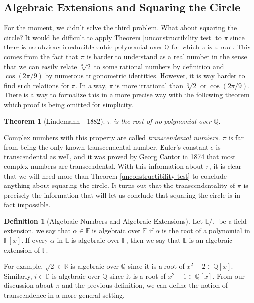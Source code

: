\documentclass{article}
\theoremstyle{plain}
\newtheorem{theorem}{Theorem}[subsection]
\theoremstyle{definition}
\newtheorem*{definition}{Definition}
\newcommand{\C}{\mathbb{C}}
\newcommand{\R}{\mathbb{R}}
\newcommand{\Q}{\mathbb{Q}}
\newcommand{\F}{\mathbb{F}}
\newcommand{\E}{\mathbb{E}}
\begin{document}
\subsection{Algebraic Extensions and Squaring the Circle}

For the moment, we didn't solve the third problem. What about squaring the circle? It would be difficult to apply Theorem \ref{unconstructibility test} to $\pi$ since there is no obvious irreducible cubic polynomial over $\Q$ for which $\pi$ is a root. This comes from the fact that $\pi$ is harder to understand as a real number in the sense that we can easily relate $\sqrt[3]{2}$ to some rational numbers by definition and $\cos (2\pi / 9)$ by numerous trigonometric identities. However, it is way harder to find such relations  for $\pi$. In a way, $\pi$ is more irrational than $\sqrt[3]{2}$ or $\cos(2\pi / 9)$. There is a way to formalize this in a more precise way with the following theorem which proof is being omitted for simplicity.

\begin{theorem}[Lindemann - 1882]
\label{lindemann}
    $\pi$ is the root of no polynomial over $\Q$.
\end{theorem}

Complex numbers with this property are called \textit{transcendental numbers}. $\pi$ is far from being the only known transcendental number, Euler's constant $e$ is transcendental as well, and it was proved by Georg Cantor in 1874 that most complex numbers are transcendental. With this information about $\pi$, it is clear that we will need more than Theorem \ref{unconstructibility test} to conclude anything about squaring the circle. It turns out that the transcendentality of $\pi$ is precisely the information that will let us conclude that squaring the circle is in fact impossible.

\begin{definition}[Algebraic Numbers and Algebraic Extensions]
    Let $\E / \F$ be a field extension, we say that $\alpha \in \E$ is algebraic over $\F$ if $\alpha$ is the root of a polynomial in $\F[x]$. If every $\alpha$ in $\E$ is algebraic over $\F$, then we say that $\E$ is an algebraic extension of $\F$.
\end{definition}

For example, $\sqrt{2} \in \R$ is algebraic over $\Q$ since it is a root of $x^2 - 2 \in \Q[x]$. Similarly, $i \in \C$ is algebraic over $\Q$ since it is a root of $x^2 + 1 \in \Q[x]$. From our discussion about $\pi$ and the previous definition, we can define the notion of transcendence in a more general setting.
\end{document}

